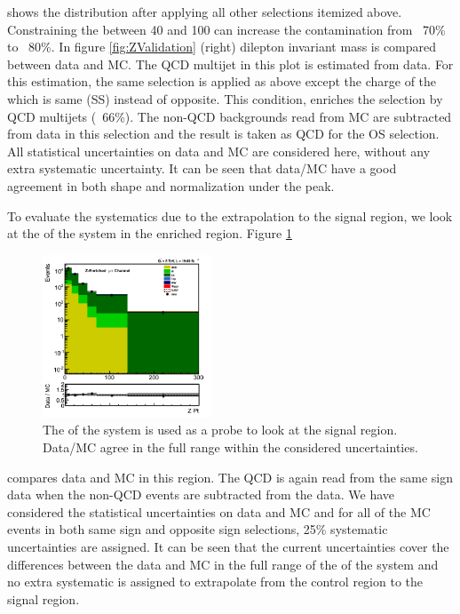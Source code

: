 shows the \tauMT distribution after applying all other selections itemized above. Constraining the \tauMT between 40 and 100 \GeV can increase the \Z contamination from ~70\% to ~80\%. In figure \ref{fig:ZValidation} (right)
dilepton invariant mass is compared between data and MC. The QCD multijet in this plot is estimated from data. For this estimation, the same 
selection is applied as above except the charge of the \muTau which is same (SS) instead of opposite. This condition, enriches the selection 
by QCD multijets (~66\%). The non-QCD backgrounds read from MC are subtracted from data in this selection and the result is 
taken as QCD for the OS selection. All statistical uncertainties on data and MC are considered here, without any extra systematic uncertainty.
It can be seen that data/MC have a good agreement in both shape and normalization under the \Z peak. 

To evaluate the systematics due to 
the extrapolation to the signal region, we look at the \pt of the \Z system in the \Z enriched region.
Figure \ref{fig:ZPtValidation}
\begin{figure}[h]
\centering
\includegraphics[width=0.45\textwidth,keepaspectratio=true]{ZValidation/ZPt_ZValidation_OSNewQCDSys.png}
\caption{The \pt of the \Z system is used as a probe to look at the signal region. Data/MC agree in the full range within 
  the considered uncertainties.}
\label{fig:ZPtValidation}
\end{figure}
compares data and MC in this region. The QCD is again read from the same sign data when the non-QCD events are subtracted from the data. We have 
considered the statistical uncertainties on data and MC and for all of the MC events in both same sign and opposite sign selections, 25\% 
systematic uncertainties are assigned. It can be seen that the current uncertainties cover the differences between the data and MC in the full 
range of the \pt of the \Z system and no extra systematic is assigned to extrapolate from the control region to the signal region.
